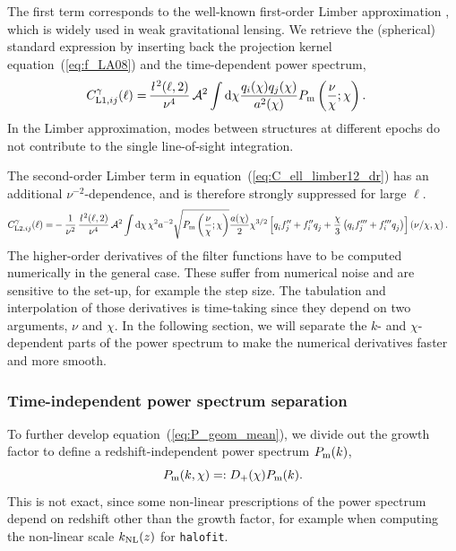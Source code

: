 \documentclass[fleqn,usenatbib]{mnras} %
\newcommand{\ellbar}{\hbox{\it \l}\,}
\newcommand{\pref}{{\cal A}}
\begin{document}
%
The first term corresponds to the well-known first-order Limber approximation
\citep{1953ApJ...117..134L,1992ApJ...388..272K}, which is widely used in
weak gravitational lensing. We retrieve the (spherical) standard expression by
inserting back the projection kernel equation~(\ref{eq:f_LA08}) and the time-dependent
power spectrum,
%
\begin{align}
  C^\gamma_{{\rm L1}, ij}(\ell) = & \, \frac{\ellbar^2(\ell, 2)}{\nu^4} \, \pref^2 \int {\rm d} \chi \frac{ q_i(\chi) q_j(\chi) }{a^2(\chi)}
  P_{\rm m}\left(\frac{\nu}{\chi}; \chi\right).
  \label{eq:C_ell_limber1}
\end{align}
%
In the Limber approximation, modes between structures at different epochs do
not contribute to the single line-of-sight integration.

The second-order Limber term in equation~(\ref{eq:C_ell_limber12_dr}) has an additional
$\nu^{-2}$-dependence, and is therefore strongly suppressed for large $\ell$.
%
\begin{align}
  C^\gamma_{{\rm L2}, ij}(\ell) = & - \frac 1 {\nu^2} \, \frac{\ellbar^2(\ell, 2)}{\nu^4} \, \pref^2
    \int {\rm d} \chi \, \chi^{2} a^{-2} \sqrt{P_{\rm m}\left(\frac\nu\chi; \chi\right)}
    \frac{a(\chi)}{2} \chi^{3/2} \left[ q^{}_i f^{\prime\prime}_j + f^{\prime\prime}_i q^{}_j
      + \frac{\chi}{3} \left( q^{}_i f^{\prime\prime\prime}_j + f^{\prime\prime\prime}_i q^{}_j
      \right)
    \right](\nu/\chi, \chi) \, .
  \label{eq:C_ell_limber2_dr} 
\end{align}
%
The higher-order derivatives of the filter functions have to be computed
numerically in the general case. These suffer from numerical noise and are
sensitive to the set-up, for example the step size. The tabulation and
interpolation of those derivatives is time-taking since they depend on two
arguments, $\nu$ and $\chi$. In the following section, we will separate the
$k$- and $\chi$-dependent parts of the power spectrum to make the numerical
derivatives faster and more smooth.

\subsubsection{Time-independent power spectrum separation}

To further develop equation~(\ref{eq:P_geom_mean}), we divide out the growth factor to
define a redshift-independent power spectrum $P_{\rm m}(k)$,
%
\begin{equation}
 P_{\rm m}(k, \chi) =: D_+(\chi) P_{\rm m}(k).
  \label{eq:P_k_chi_sep_s}
\end{equation}
%
This is not exact, since some non-linear prescriptions of the power spectrum
depend on redshift other than the growth factor, for example when computing the
non-linear scale $k_{\rm NL}(z)$ for \texttt{halofit}.
\end{document}

